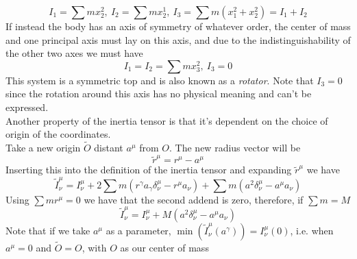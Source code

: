 \documentclass[../admech.tex]{subfiles}
\begin{document}
\begin{equation*}
	I_1=\sum mx^2_2,\ I_2=\sum mx^1_2,\ I_3=\sum m(x^2_1+x^2_2)=I_1+I_2
\end{equation*}
If instead the body has an axis of symmetry of whatever order, the center of mass and one principal axis must lay on this axis, and due to the indistinguishability of the other two axes we must have
\begin{equation*}
	I_1=I_2=\sum mx^2_3,\ I_3=0
\end{equation*}
This system is a symmetric top and is also known as a \emph{rotator}. Note that $I_3=0$ since the rotation around this axis has no physical meaning and can't be expressed.\\
Another property of the inertia tensor is that it's dependent on the choice of origin of the coordinates.\\
Take a new origin $\tilde{O}$ distant $a^\mu$ from $O$. The new radius vector will be
\begin{equation*}
	\tilde{r}^\mu=r^\mu-a^\mu
\end{equation*}
Inserting this into the definition of the inertia tensor and expanding $\tilde{r}^\mu$ we have
\begin{equation}
	\tilde{I}^\mu_\nu=I^\mu_\nu+2\sum m\left( r^\gamma a_\gamma\delta^\mu_\nu-r^\mu a_\nu \right)+\sum m\left( a^2\delta^\mu_\nu-a^\mu a_\nu \right)
	\label{eq:newinertia}
\end{equation}
Using $\sum mr^\mu=0$ we have that the second addend is zero, therefore, if $\sum m=M$
\begin{equation}
	\tilde{I}^\mu_\nu=I^\mu_\nu+M\left( a^2\delta^\mu_\nu-a^\mu a_\nu \right)
	\label{eq:newinertia1}
\end{equation}
Note that if we take $a^\mu$ as a parameter, $\min\left( \tilde{I}^\mu_\nu(a^\gamma) \right)=I^\mu_\nu(0)$, i.e. when $a^\mu=0$ and $\tilde{O}=O$, with $O$ as our center of mass
\end{document}
